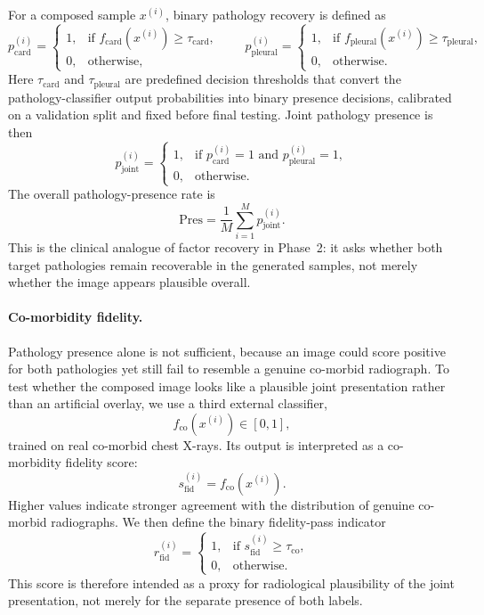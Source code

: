 For a composed sample \(x^{(i)}\), binary pathology recovery is defined as
\[
p_{\mathrm{card}}^{(i)}
=
\begin{cases}
1, & \text{if } f_{\mathrm{card}}(x^{(i)}) \ge \tau_{\mathrm{card}},\\[6pt]
0, & \text{otherwise,}
\end{cases}
\qquad
p_{\mathrm{pleural}}^{(i)}
=
\begin{cases}
1, & \text{if } f_{\mathrm{pleural}}(x^{(i)}) \ge \tau_{\mathrm{pleural}},\\[6pt]
0, & \text{otherwise.}
\end{cases}
\]
Here \(\tau_{\mathrm{card}}\) and \(\tau_{\mathrm{pleural}}\) are predefined decision thresholds that convert the pathology-classifier output probabilities into binary presence decisions, calibrated on a validation split and fixed before final testing.
Joint pathology presence is then
\[
p_{\mathrm{joint}}^{(i)}
=
\begin{cases}
1, & \text{if } p_{\mathrm{card}}^{(i)} = 1 \text{ and } p_{\mathrm{pleural}}^{(i)} = 1,\\[6pt]
0, & \text{otherwise.}
\end{cases}
\]
The overall pathology-presence rate is
\[
\mathrm{Pres}
=
\frac{1}{M}\sum_{i=1}^{M} p_{\mathrm{joint}}^{(i)}.
\]
This is the clinical analogue of factor recovery in Phase~2: it asks whether both target pathologies remain recoverable in the generated samples, not merely whether the image appears plausible overall.
\paragraph{Co-morbidity fidelity.}
Pathology presence alone is not sufficient, because an image could score positive for both pathologies yet still fail to resemble a genuine co-morbid radiograph. To test whether the composed image looks like a plausible joint presentation rather than an artificial overlay, we use a third external classifier,
\[
f_{\mathrm{co}}(x^{(i)}) \in [0,1],
\]
trained on real co-morbid chest X-rays. Its output is interpreted as a co-morbidity fidelity score:
\[
s_{\mathrm{fid}}^{(i)} = f_{\mathrm{co}}(x^{(i)}).
\]
Higher values indicate stronger agreement with the distribution of genuine co-morbid radiographs. We then define the binary fidelity-pass indicator
\[
r_{\mathrm{fid}}^{(i)}
=
\begin{cases}
1, & \text{if } s_{\mathrm{fid}}^{(i)} \ge \tau_{\mathrm{co}},\\[6pt]
0, & \text{otherwise.}
\end{cases}
\]
This score is therefore intended as a proxy for radiological plausibility of the joint presentation, not merely for the separate presence of both labels.

